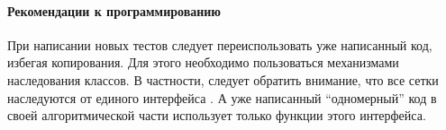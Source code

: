 \paragraph{Рекомендации к программированию}
При написании новых тестов следует переиспользовать уже написанный код, избегая копирования.
Для этого необходимо пользоваться механизмами наследования классов.
В частности, следует обратить внимание, что все сетки наследуются
от единого интерфейса . А уже написанный ``одномерный'' код 
в своей алгоритмической части использует только функции этого интерфейса.
